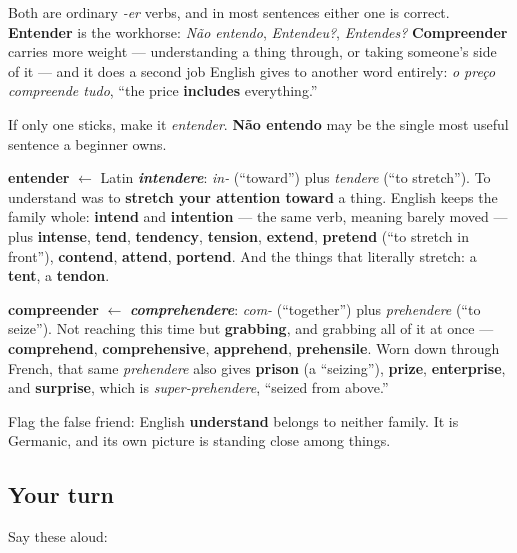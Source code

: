 Both are ordinary \emph{-er} verbs, and in most sentences either one is correct. \textbf{Entender} is the workhorse: \emph{Não entendo}, \emph{Entendeu?}, \emph{Entendes?} \textbf{Compreender} carries more weight — understanding a thing through, or taking someone's side of it — and it does a second job English gives to another word entirely: \emph{o preço compreende tudo}, \textquotedblleft{}the price \textbf{includes} everything.\textquotedblright{}

If only one sticks, make it \emph{entender}. \textbf{Não entendo} may be the single most useful sentence a beginner owns.

\begin{cousinweb}
\textbf{entender} $\leftarrow$ Latin \emph{\textbf{intendere}}: \emph{in-} (\textquotedblleft{}toward\textquotedblright{}) plus \emph{tendere} (\textquotedblleft{}to stretch\textquotedblright{}). To understand was to \textbf{stretch your attention toward} a thing. English keeps the family whole: \textbf{intend} and \textbf{intention} — the same verb, meaning barely moved — plus \textbf{intense}, \textbf{tend}, \textbf{tendency}, \textbf{tension}, \textbf{extend}, \textbf{pretend} (\textquotedblleft{}to stretch in front\textquotedblright{}), \textbf{contend}, \textbf{attend}, \textbf{portend}. And the things that literally stretch: a \textbf{tent}, a \textbf{tendon}.

\textbf{compreender} $\leftarrow$ \emph{\textbf{comprehendere}}: \emph{com-} (\textquotedblleft{}together\textquotedblright{}) plus \emph{prehendere} (\textquotedblleft{}to seize\textquotedblright{}). Not reaching this time but \textbf{grabbing}, and grabbing all of it at once — \textbf{comprehend}, \textbf{comprehensive}, \textbf{apprehend}, \textbf{prehensile}. Worn down through French, that same \emph{prehendere} also gives \textbf{prison} (a \textquotedblleft{}seizing\textquotedblright{}), \textbf{prize}, \textbf{enterprise}, and \textbf{surprise}, which is \emph{super-prehendere}, \textquotedblleft{}seized from above.\textquotedblright{}

Flag the false friend: English \textbf{understand} belongs to neither family. It is Germanic, and its own picture is standing close among things.
\end{cousinweb}

\subsection*{Your turn}
Say these aloud:

